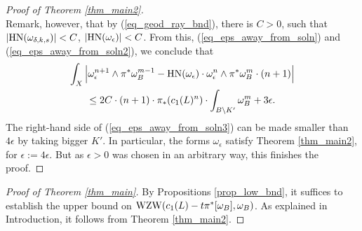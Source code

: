 \documentclass[12pt]{article}
\numberwithin{equation}{section}
\theoremstyle{theorem}
\theoremstyle{definition}
\theoremstyle{remark}
\begin{document}
\begin{proof}[Proof of Theorem \ref{thm_main2}]
\begin{equation}
		\end{equation}
		Remark, however, that by (\ref{eq_geod_ray_bnd}), there is $C > 0$, such that $|{\rm{HN}}(\omega_{\delta, k, s})| < C$, $|{\rm{HN}}(\omega_{\epsilon})| < C$.
		From this, (\ref{eq_eps_away_from_soln}) and (\ref{eq_eps_away_from_soln2}), we conclude that 
		\begin{multline}\label{eq_eps_away_from_soln3}
			\int_{X}
			\Big|
			\omega_{\epsilon}^{n + 1} \wedge \pi^* \omega_B^{m - 1}
			-
			{\rm{HN}}(\omega_{\epsilon}) \cdot \omega_{\epsilon}^n \wedge  \pi^* \omega_B^m \cdot (n + 1)
			\Big|
			\\
			\leq
			2 C \cdot (n + 1) \cdot
			\pi_* (c_1(L)^n)
			\cdot
			\int_{B \setminus K'} \omega_B^m 
			+
			3 \epsilon.
		\end{multline}
		The right-hand side of (\ref{eq_eps_away_from_soln3}) can be made smaller than $4 \epsilon$ by taking bigger $K'$.
		In particular, the forms $\omega_{\epsilon}$ satisfy Theorem \ref{thm_main2}, for $\epsilon := 4 \epsilon$.
		But as $\epsilon > 0$ was chosen in an arbitrary way, this finishes the proof.
	\end{proof}
	\begin{sloppypar}
	\begin{proof}[Proof of Theorem \ref{thm_main}]
		By Propositions \ref{prop_low_bnd}, it suffices to establish the upper bound on ${\rm{WZW}}(c_1(L) - t \pi^* [\omega_B], \omega_B)$. 
		As explained in Introduction, it follows from Theorem \ref{thm_main2}.
	\end{proof}
	\end{sloppypar}
	
\end{document}
